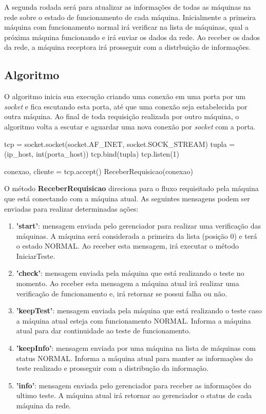 A segunda rodada será para atualizar as informações de todas as máquinas na rede sobre o estado de funcionamento de cada máquina. Inicialmente a primeira máquina com funcionamento normal 
irá verificar na lista de máquinas, qual a próxima máquina funcionando e irá enviar os dados da rede. Ao receber os dados da rede, a máquina receptora irá prosseguir com a distrbuição 
de informações.

\subsection{Algoritmo}
\label{sub:adaptiveDSD_Algoritmo}
O algoritmo \adaptive inicia sua execução criando uma conexão em uma porta por um \textit{socket} e fica escutando esta porta, até que uma conexão seja estabelecida por outra máquina.
Ao final de toda requisição realizada por outro máquina, o algoritmo volta a escutar e aguardar uma nova conexão por \textit{socket} com a porta.

\vspace*{1cm}
\begin{python}
    tcp = socket.socket(socket.AF_INET, socket.SOCK_STREAM)
    tupla = (ip_host, int(porta_host))
    tcp.bind(tupla)
    tcp.listen(1)

    conexao, cliente = tcp.accept() 
    ReceberRequisicao(conexao)
\end{python}
\vspace*{1cm}

O método \textbf{ReceberRequisicao} direciona para o fluxo requisitado pela máquina que está conectando com a máquina atual. As seguintes mensagens podem ser enviadas para realizar determinadas ações:

\vspace*{1cm}
\begin{enumerate}
    \item \textbf{'start'}: mensagem enviada pelo gerenciador para realizar uma verificação das máquinas. A máquina será considerada a primeira da lista (posição 0) e terá o estado NORMAL. Ao receber esta mensagem,
    irá executar o método IniciarTeste.
    \item \textbf{'check'}: mensagem enviada pela máquina que está realizando o teste no momento. Ao receber esta mensagem a máquina atual irá realizar uma verificação de funcionamento e, 
    irá retornar se possui falha ou não.
    \item \textbf{'keepTest'}: mensagem enviada pela máquina que está realizando o teste caso a máquina atual esteja com funcionamento NORMAL. Informa a máquina atual para dar continuidade ao teste de funcionamento.
    \item \textbf{'keepInfo'}: mensagem enviada por uma máquina na lista de máquinas com status NORMAL. Informa a máquina atual para manter as informações do teste realizado e prosseguir com a distribução da informação.
    \item \textbf{'info'}: mensagem enviada pelo gerenciador para receber as informações do ultimo teste. A máquina atual irá retornar ao gerenciador o status de cada máquina da rede.
  \end{enumerate}

